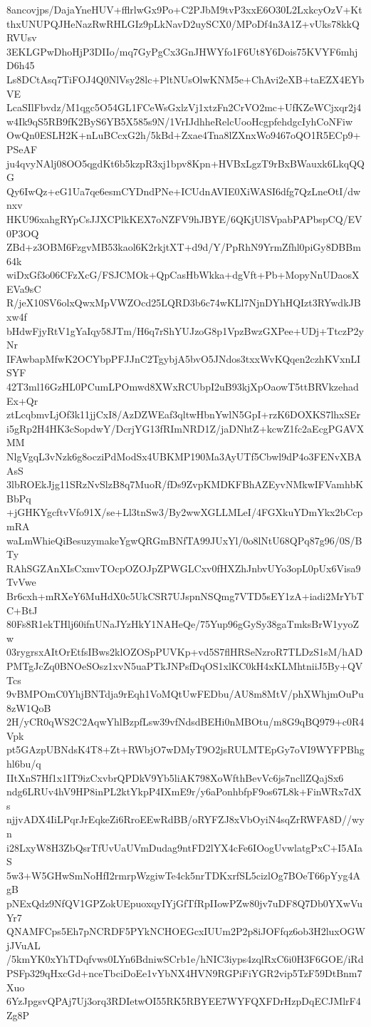 8ancovjps/DajaYneHUV+fflrlwGx9Po+C2PJbM9tvP3xxE6O30L2LxkcyOzV+Kt
thxUNUPQJHeNazRwRHLGIz9pLkNavD2uySCX0/MPoDf4n3A1Z+vUks78kkQRVUsv
3EKLGPwDhoHjP3DIIo/mq7GyPgCx3GnJHWYfo1F6Ut8Y6Dois75KVYF6mhjD6h45
Ls8DCtAsq7TiFOJ4Q0NlVsy28lc+PltNUsOlwKNM5e+ChAvi2eXB+taEZX4EYbVE
LcaSIlFbvdz/M1qgc5O54GL1FCeWsGxlzVj1xtzFn2CrVO2mc+UfKZeWCjxqr2j4
w4Ik9qS5RB9fK2ByS6YB5X585s9N/1VrIJdhheRelcUooHcgpfehdgcIyhCoNFiw
OwQn0ESLH2K+nLuBCcxG2h/5kBd+Zxae4Tna8lZXnxWo9467oQO1R5ECp9+PSeAF
ju4qvyNAlj08OO5qgdKt6b5kzpR3xj1bpv8Kpn+HVBxLgzT9rBxBWauxk6LkqQQG
Qy6IwQz+eG1Ua7qe6esmCYDndPNe+ICUdnAVIE0XiWASI6dfg7QzLneOtI/dwnxv
HKU96xahgRYpCsJJXCPlkKEX7oNZFV9hJBYE/6QKjUlSVpabPAPbspCQ/EV0P3OQ
ZBd+z3OBM6FzgvMB53kaol6K2rkjtXT+d9d/Y/PpRhN9YrmZfhl0piGy8DBBm64k
wiDxGf3o06CFzXcG/FSJCMOk+QpCasHbWkka+dgVft+Pb+MopyNnUDaosXEVa9sC
R/jeX10SV6olxQwxMpVWZOcd25LQRD3b6c74wKLl7NjnDYhHQIzt3RYwdkJBxw4f
bHdwFjyRtV1gYaIqy58JTm/H6q7rShYUJzoG8p1VpzBwzGXPee+UDj+TtczP2yNr
IFAwbapMfwK2OCYbpPFJJnC2TgybjA5bvO5JNdos3txxWvKQqen2czhKVxnLISYF
42T3ml16GzHL0PCumLPOmwd8XWxRCUbpI2uB93kjXpOaowT5ttBRVkzehadEx+Qr
ztLcqbmvLjOf3k11jjCxI8/AzDZWEaf3qltwHbnYwlN5GpI+rzK6DOXKS7lhxSEr
i5gRp2H4HK3cSopdwY/DcrjYG13fRImNRD1Z/jaDNhtZ+kcwZ1fc2aEcgPGAVXMM
NlgVgqL3vNzk6g8ocziPdModSx4UBKMP190Ma3AyUTf5Cbwl9dP4o3FENvXBAAsS
3lbROEkJjg11SRzNvSlzB8q7MuoR/fDs9ZvpKMDKFBhAZEyvNMkwIFVamhbKBbPq
+jGHKYgcftvVfo91X/se+Ll3tnSw3/By2wwXGLLMLeI/4FGXkuYDmYkx2bCcpmRA
waLmWhieQiBesuzymakeYgwQRGmBNfTA99JUxYl/0o8lNtU68QPq87g96/0S/BTy
RAhSGZAnXIsCxmvTOcpOZOJpZPWGLCxv0fHXZhJnbvUYo3opL0pUx6Visa9TvVwe
Br6cxh+mRXeY6MuHdX0c5UkCSR7UJspnNSQmg7VTD5sEY1zA+iadi2MrYbTC+BtJ
80Fs8R1ekTHlj60ifnUNaJYzHkY1NAHeQe/75Yup96gGySy38gaTmksBrW1yyoZw
03rygrsxAItOrEtfsIBws2klOZOSpPUVKp+vd5S7flHRSeNzroR7TLDzS1sM/hAD
PMTgJcZq0BNOeSOsz1xvN5uaPTkJNPsfDqOS1xlKC0kH4xKLMhtniiJ5By+QVTcs
9vBMPOmC0YhjBNTdja9rEqh1VoMQtUwFEDbu/AU8m8MtV/phXWhjmOuPu8zW1QoB
2H/yCR0qWS2C2AqwYhlBzpfLsw39vfNdsdBEHi0nMBOtu/m8G9qBQ979+c0R4Vpk
pt5GAzpUBNdsK4T8+Zt+RWbjO7wDMyT9O2jsRULMTEpGy7oVI9WYFPBhghl6bu/q
IItXnS7Hf1x1IT9izCxvbrQPDkV9Yb5liAK798XoWfthBevVc6js7ncllZQajSx6
ndg6LRUv4hV9HP8inPL2ktYkpP4IXmE9r/y6aPonhbfpF9os67L8k+FinWRx7dXs
njjvADX4IiLPqrJrEqkeZi6RroEEwRdBB/oRYFZJ8xVbOyiN4sqZrRWFA8D//wyn
i28LxyW8H3ZbQsrTfUvUaUVmDudag9ntFD2lYX4cFe6IOogUvwlatgPxC+I5AIaS
5w3+W5GHwSmNoHfI2rmrpWzgiwTe4ck5nrTDKxrfSL5cizlOg7BOeT66pYyg4AgB
pNExQdz9NfQV1GPZokUEpuoxqyIYjGfTfRpIIowPZw80jv7uDF8Q7Db0YXwVuYr7
QNAMFCps5Eh7pNCRDF5PYkNCHOEGcxIUUm2P2p8iJOFfqz6ob3H2luxOGWjJVuAL
/5kmYK0xYhTDqfvws0LYn6BdniwSCrb1e/hNIC3iyps4zqlRxC6i0H3F6GOE/iRd
PSFp329qHxcGd+nceTbciDoEe1vYbNX4HVN9RGPiFiYGR2vip5TzF59DtBnm7Xuo
6YzJpgsvQPAj7Uj3orq3RDIetwOI55RK5RBYEE7WYFQXFDrHzpDqECJMlrF4Zg8P
